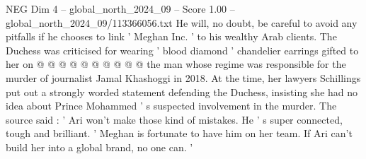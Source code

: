 \begin{textsample}{NEG Dim 4 – global\_north\_2024\_09 – Score 1.00 – global\_north\_2024\_09/113366056.txt}
He will, no doubt, be careful to avoid any pitfalls if he chooses to link ' Meghan Inc. ' to his wealthy Arab clients.
The Duchess was criticised for wearing ' blood diamond ' chandelier earrings gifted to her on @ @ @ @ @ @ @ @ @ @ the man whose regime was responsible for the murder of journalist Jamal Khashoggi in 2018.
At the time, her lawyers Schillings put out a strongly worded statement defending the Duchess, insisting she had no idea about Prince Mohammed ' s suspected involvement in the murder.
The source said : ' Ari won't make those kind of mistakes.
He ' s super connected, tough and brilliant. ' Meghan is fortunate to have him on her team.
If Ari can't build her into a global brand, no one can. '

\end{textsample}
